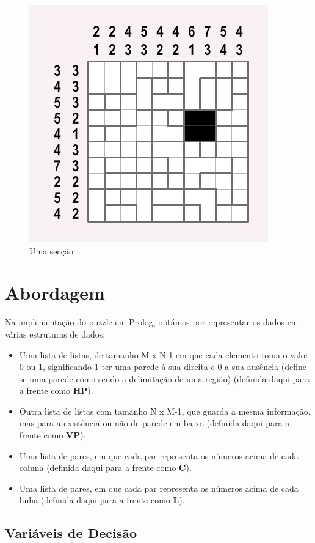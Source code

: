 \documentclass[runningheads,a4paper]{llncs}
\begin{document}
\begin{figure}[h]
\centering
\includegraphics[scale=0.5]{res/section.png}
\caption{Uma secção}
\label{fig:section}
\end{figure}

\section{Abordagem}

Na implementação do puzzle em Prolog, optámos por representar os dados em várias estruturas de dados:

\begin{itemize}
\item Uma lista de listas, de tamanho M x N-1 em que cada elemento toma o valor 0 ou 1, significando 1 ter uma parede à sua direita e 0 a sua ausência (define-se uma parede como sendo a delimitação de uma região) (definida daqui para a frente como \textbf{HP}).
\item Outra lista de listas com tamanho N x M-1, que guarda a mesma informação, mas para a existência ou não de parede em baixo (definida daqui para a frente como \textbf{VP}).
\item Uma lista de pares, em que cada par representa os números acima de cada coluna (definida daqui para a frente como \textbf{C}).
\item Uma lista de pares, em que cada par representa os números acima de cada linha (definida daqui para a frente como \textbf{L}).
\end{itemize}

\subsection{Variáveis de Decisão}
\end{document}
